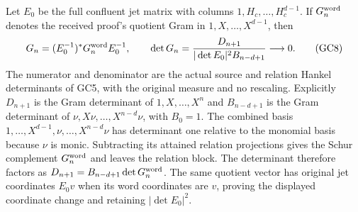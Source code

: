 \documentclass[11pt,a4paper]{article}
\theoremstyle{definition}\newtheorem{definition}[theorem]{Definition}
\begin{document}
Let $E_0$ be the full confluent jet matrix with columns
$1,H_c,\ldots,H_c^{d-1}$. If $G_n^{\rm word}$ denotes the
received proof's quotient Gram in $1,X,\ldots,X^{d-1}$, then
\[
 G_n=(E_0^{-1})^*G_n^{\rm word}E_0^{-1},\qquad
 \det G_n=\frac{D_{n+1}}{|\det E_0|^2 B_{n-d+1}}\longrightarrow0.
 \tag{GC8}\label{gc:determinant}
\]
The numerator and denominator are the actual source and relation
Hankel determinants of GC5, with the original measure and no
rescaling. Explicitly $D_{n+1}$ is the Gram determinant of
$1,X,\ldots,X^n$ and $B_{n-d+1}$ is the Gram determinant of
$\nu,X\nu,\ldots,X^{n-d}\nu$, with $B_0=1$.
The combined basis
$1,\ldots,X^{d-1},\nu,\ldots,X^{n-d}\nu$ has determinant one
relative to the monomial basis because $\nu$ is monic.
Subtracting its attained relation projections gives the Schur
complement $G_n^{\rm word}$ and leaves the relation block.
The determinant therefore factors as
$D_{n+1}=B_{n-d+1}\det G_n^{\rm word}$.
The same quotient vector has original jet coordinates $E_0v$
when its word coordinates are $v$, proving the displayed
coordinate change and retaining $|\det E_0|^2$.
\end{document}
